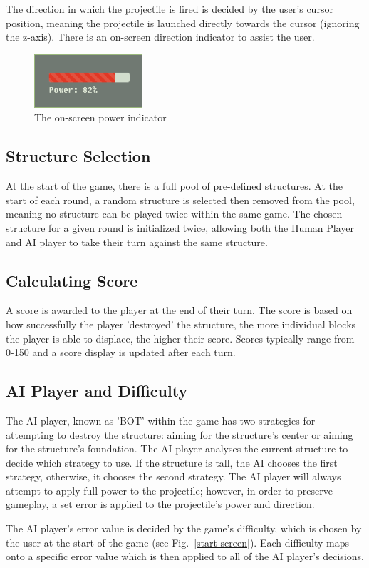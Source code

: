 \documentclass[runningheads]{llncs}
\begin{document}
	The direction in which the projectile is fired is decided by the user's cursor position, meaning the projectile is launched directly towards the cursor (ignoring the z-axis). There is an on-screen direction indicator to assist the user.
	\begin{figure}
		\centering
		\includegraphics{./img/power-indicator.png}
		\caption{The on-screen power indicator}
		\label{power-indicator}
	\end{figure}
	\subsection{Structure Selection}
	At the start of the game, there is a full pool of pre-defined structures. At the start of each round, a random structure is selected then removed from the pool, meaning no structure can be played twice within the same game. The chosen structure for a given round is initialized twice, allowing both the Human Player and AI player to take their turn against the same structure.
	\subsection{Calculating Score}
	A score is awarded to the player at the end of their turn. The score is based on how successfully the player 'destroyed' the structure, the more individual blocks the player is able to displace, the higher their score. Scores typically range from 0-150 and a score display is updated after each turn.
	\subsection{AI Player and Difficulty}
	The AI player, known as 'BOT' within the game has two strategies for attempting to destroy the structure: aiming for the structure's center or aiming for the structure's foundation. The AI player analyses the current structure to decide which strategy to use. If the structure is tall, the AI chooses the first strategy, otherwise, it chooses the second strategy. The AI player will always attempt to apply full power to the projectile; however, in order to preserve gameplay, a set error is applied to the projectile's power and direction. 
	
	The AI player's error value is decided by the game's difficulty, which is chosen by the user at the start of the game (see Fig.~\ref{start-screen}). Each difficulty maps onto a specific error value which is then applied to all of the AI player's decisions.
\end{document}
